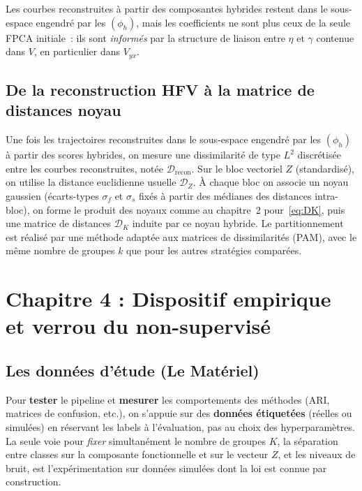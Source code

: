 \documentclass[11pt,a4paper]{article}
\begin{document}
Les courbes reconstruites à partir des composantes hybrides restent dans le
sous-espace engendré par les $(\phi_h)$, mais les coefficients ne sont
plus ceux de la seule FPCA initiale~: ils sont \emph{informés} par la structure
de liaison entre $\eta$ et $\gamma$ contenue dans $V$, en
particulier dans $V_{yx}$.

\subsection{De la reconstruction HFV à la matrice de distances noyau}
\label{sec:hfv_noyaux_D1}
Une fois les trajectoires reconstruites dans le sous-espace engendré par les
$(\phi_h)$ à partir des scores hybrides, on mesure une dissimilarité de type
$L^2$ discrétisée entre les courbes reconstruites, notée
$\mathcal{D}_{\mathrm{recon}}$. Sur le bloc vectoriel $Z$ (standardisé), on
utilise la distance euclidienne usuelle $\mathcal{D}_Z$. À chaque bloc on
associe un noyau gaussien (écarts-types $\sigma_f$ et $\sigma_s$ fixés à partir
des médianes des distances intra-bloc), on forme le produit des noyaux comme
au chapitre~2 pour~\eqref{eq:DK}, puis une matrice de distances
$\mathcal{D}_K$ induite par ce noyau hybride. Le partitionnement est réalisé par
une méthode adaptée aux matrices de dissimilarités (PAM), avec le même nombre
de groupes $k$ que pour les autres stratégies comparées.

\section{Chapitre 4 : Dispositif empirique et verrou du non-supervisé}

\subsection{Les données d'étude (Le Matériel)}
\label{sec:materiel}

Pour \textbf{tester} le pipeline et \textbf{mesurer} les comportements des
méthodes (ARI, matrices de confusion, etc.), on s'appuie sur des \textbf{données
étiquetées} (réelles ou simulées) en réservant les labels à
l'évaluation, pas au choix des hyperparamètres. La seule voie pour \emph{fixer}
simultanément le nombre de groupes $K$, la séparation entre classes sur la
composante fonctionnelle et sur le vecteur $Z$, et les niveaux de bruit, est
l'expérimentation sur données simulées dont la loi est connue par construction.
\end{document}
